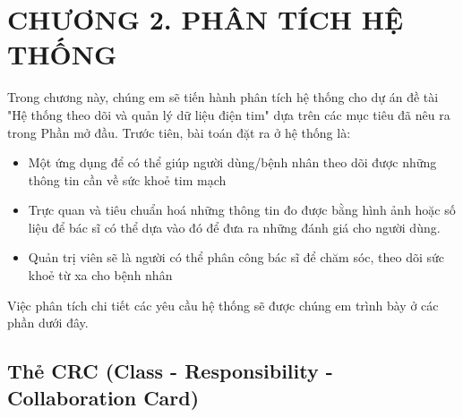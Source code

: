 
\section*{CHƯƠNG 2. PHÂN TÍCH HỆ THỐNG}
\setcounter{section}{2}
\setcounter{subsection}{0} %
\setcounter{table}{0} %
\setcounter{figure}{0} %
Trong chương này, chúng em sẽ tiến hành phân tích hệ thống cho dự án đề tài "Hệ thống theo dõi và quản lý dữ liệu điện tim" dựa trên các mục tiêu
đã nêu ra trong Phần mở đầu. Trước tiên, bài toán đặt ra ở hệ thống là:
\begin{adjustwidth}{1.5em}{}
\begin{itemize}
  \item Một ứng dụng để có thể giúp người dùng/bệnh nhân theo dõi được những thông tin cần về sức khoẻ tim mạch
  \item Trực quan và tiêu chuẩn hoá những thông tin đo được
    bằng hình ảnh hoặc số liệu để bác sĩ có thể dựa vào đó để đưa ra những đánh giá cho người dùng. 
  \item Quản trị viên sẽ là người có thể phân công bác sĩ để chăm sóc, theo dõi sức khoẻ từ
  xa cho bệnh nhân
\end{itemize}
\end{adjustwidth}
Việc phân tích chi tiết các yêu cầu hệ thống sẽ được chúng em trình bày ở các phần dưới đây.
\subsection{Thẻ CRC (Class - Responsibility - Collaboration Card)}

